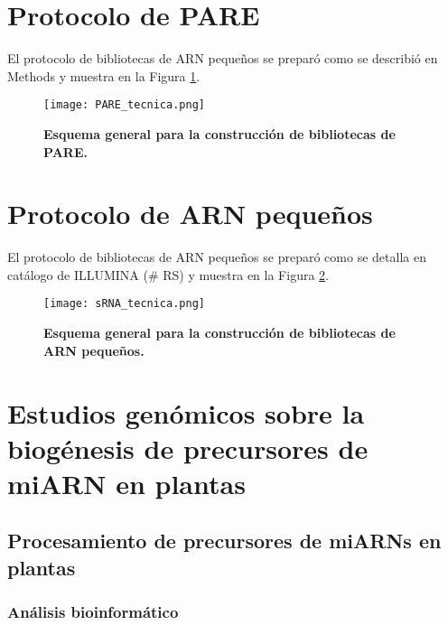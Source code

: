 \section{Protocolo de PARE}

El protocolo de bibliotecas de ARN pequeños se preparó como se describió en Methods \citep{pmid23810899} y muestra en la Figura \ref{fig:PARE_tecnica}.

\begin{figure}[htbp!]
	\centering    
	\texttt{[image: PARE\_tecnica.png]}
	\caption[Esquema general para la construcción de bibliotecas de PARE]{
		\textbf{Esquema general para la construcción de bibliotecas de PARE.}
	}
	 \label{fig:PARE_tecnica}
\end{figure}


\section{Protocolo de ARN pequeños}

El protocolo de bibliotecas de ARN pequeños se preparó como se detalla en catálogo de ILLUMINA (\# RS) y muestra en la Figura \ref{fig:sRNA_tecnica}.

\begin{figure}[htbp!]
	\centering    
	\texttt{[image: sRNA\_tecnica.png]}
	\caption[Esquema general para la construcción de bibliotecas de ARN pequeños]{
		\textbf{Esquema general para la construcción de bibliotecas de ARN pequeños.}
	}
	 \label{fig:sRNA_tecnica}
\end{figure}


\section{Estudios genómicos sobre la biogénesis de precursores de miARN en plantas}

\subsection{Procesamiento de precursores de miARNs en plantas}

\subsubsection{Análisis bioinformático}

